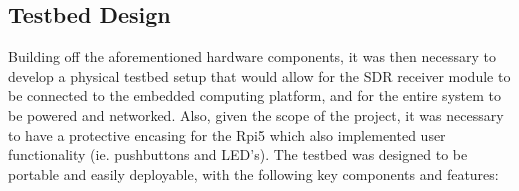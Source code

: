 \subsection{Testbed Design \label{sec:testbed}}
Building off the aforementioned hardware components, it was then necessary to develop a physical testbed setup that would allow for the SDR receiver module to be connected to the embedded computing platform, and for the entire system to be powered and networked. Also, given the scope of the project, it was necessary to have a protective encasing for the Rpi5 which also implemented user functionality (ie. pushbuttons and LED's). The testbed was designed to be portable and easily deployable, with the following key components and features:


